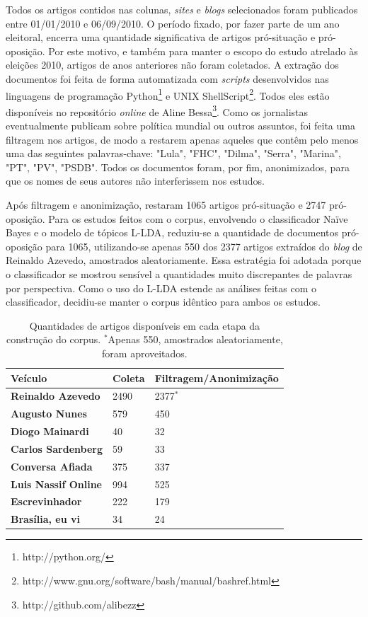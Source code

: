 Todos os artigos contidos nas colunas, \emph{sites} e \emph{blogs} selecionados foram  publicados entre 01/01/2010 e 06/09/2010. O período fixado, por fazer parte de um ano eleitoral, encerra uma quantidade significativa de artigos pró-situação e pró-oposição. Por este motivo, e também para manter o escopo do estudo atrelado às eleições 2010, artigos de anos anteriores não foram coletados. A extração dos documentos foi feita de forma automatizada com \emph{scripts} desenvolvidos nas linguagens de programação Python\footnote{http://python.org/} e UNIX ShellScript\footnote{http://www.gnu.org/software/bash/manual/bashref.html}. Todos eles estão disponíveis no repositório \emph{online} de Aline Bessa\footnote{http://github.com/alibezz}. Como os jornalistas eventualmente publicam sobre política mundial ou outros assuntos, foi feita uma filtragem nos artigos, de modo a restarem apenas aqueles que contêm pelo menos uma das seguintes palavras-chave: "Lula", "FHC", "Dilma", "Serra", "Marina", "PT", "PV", "PSDB". Todos os documentos foram, por fim, anonimizados, para que os nomes de seus autores não interferissem nos estudos. 

Após filtragem e anonimização, restaram 1065 artigos pró-situação e 2747 pró-oposição. Para os estudos feitos com o corpus, envolvendo o classificador Naïve Bayes e o modelo de tópicos L-LDA, reduziu-se a quantidade de documentos pró-oposição para 1065, utilizando-se apenas 550 dos 2377 artigos extraídos do \emph{blog} de Reinaldo Azevedo, amostrados aleatoriamente. Essa estratégia foi adotada porque o classificador se mostrou sensível a quantidades muito discrepantes de palavras por perspectiva. Como o uso do L-LDA estende as análises feitas com o classificador, decidiu-se manter o corpus idêntico para ambos os estudos. 

\begin{table}[t]
\centering
\begin{tabular}{| l | l | p{5cm} | }
\hline

\textbf{Veículo} & \textbf{Coleta} & \textbf{Filtragem/Anonimização} \\ \hline

\textbf{Reinaldo Azevedo} & 2490 & 2377\ensuremath{^*} \\ \hline
\textbf{Augusto Nunes} & 579 & 450 \\ \hline
\textbf{Diogo Mainardi} & 40 & 32 \\ \hline
\textbf{Carlos Sardenberg} & 59 & 33  \\ \hline
\textbf{Conversa Afiada} & 375 & 337  \\ \hline
\textbf{Luis Nassif Online} & 994 & 525 \\ \hline
\textbf{Escrevinhador} & 222 & 179  \\ \hline
\textbf{Brasília, eu vi} & 34 & 24  \\ \hline
\end{tabular}
\label{tab1:estudo}
\caption{Quantidades de artigos disponíveis em cada etapa da construção do corpus. \ensuremath{^*}Apenas 550, amostrados aleatoriamente, foram aproveitados.}
\end{table}

